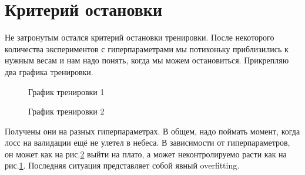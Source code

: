 \documentclass[12pt,a4paper]{report}
\begin{document}
\section*{Критерий остановки}
Не затронутым остался критерий остановки тренировки. После некоторого количества экспериментов с гиперпараметрами мы потихоньку приблизились к нужным весам и нам надо понять, когда мы можем остановиться.
Прикрепляю два графика тренировки. 
\begin{figure}[h]
	\caption{График тренировки 1}
	\label{fig:train1}
\end{figure}
\begin{figure}[h]
	\caption{График тренировки 2}
	\label{fig:train2}
\end{figure}
Получены они на разных гиперпараметрах. В общем, надо поймать момент, когда лосс на валидации ещё не улетел в небеса. В зависимости от гиперпараметров, он может как на рис.\ref{fig:train2} выйти на плато, а может неконтролируемо расти как на рис.\ref{fig:train1}. Последняя ситуация представляет собой явный overfitting.
\end{document}
